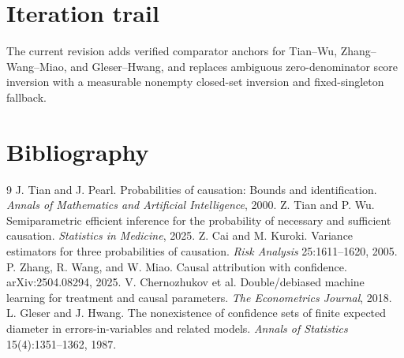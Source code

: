 \documentclass[11pt]{article}
\begin{document}
\section{Iteration trail}
The current revision adds verified comparator anchors for Tian--Wu, Zhang--Wang--Miao, and Gleser--Hwang, and replaces ambiguous zero-denominator score inversion with a measurable nonempty closed-set inversion and fixed-singleton fallback.

\section*{Bibliography}
\begin{thebibliography}{9}
 J. Tian and J. Pearl. Probabilities of causation: Bounds and identification. \emph{Annals of Mathematics and Artificial Intelligence}, 2000.
 Z. Tian and P. Wu. Semiparametric efficient inference for the probability of necessary and sufficient causation. \emph{Statistics in Medicine}, 2025.
 Z. Cai and M. Kuroki. Variance estimators for three probabilities of causation. \emph{Risk Analysis} 25:1611--1620, 2005.
 P. Zhang, R. Wang, and W. Miao. Causal attribution with confidence. arXiv:2504.08294, 2025.
 V. Chernozhukov et al. Double/debiased machine learning for treatment and causal parameters. \emph{The Econometrics Journal}, 2018.
 L. Gleser and J. Hwang. The nonexistence of confidence sets of finite expected diameter in errors-in-variables and related models. \emph{Annals of Statistics} 15(4):1351--1362, 1987.
\end{thebibliography}
\end{document}
